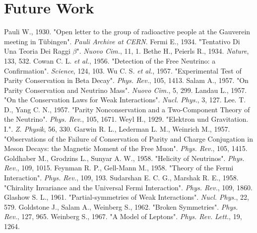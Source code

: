 \documentclass[english]{article}
\begin{document}
\section{Future Work}
    
\begin{thebibliography}{99}

    Pauli W., 1930. "Open letter to the group of radioactive people at the Gauverein meeting in T\"{u}bingen". \textit{Pauli Archive at CERN}.
    Fermi E., 1934. "Tentativo Di Una Teoria Dei Raggi $\beta$". \textit{Nuovo Cim.}, 11, 1.
    Bethe H., Peierls R., 1934. \textit{Nature}, 133, 532.
    Cowan C. L. \textit{et al.}, 1956. "Detection of the Free Neutrino: a Confirmation". \textit{Science}, 124, 103.
    Wu C. S. \textit{et al.}, 1957. "Experimental Test of Parity Conservation in Beta Decay". \textit{Phys. Rev.}, 105, 1413.
    Salam A., 1957. "On Parity Conservation and Neutrino Mass". \textit{Nuovo Cim.}, 5, 299.
    Landau L., 1957. "On the Conservation Laws for Weak Interactions". \textit{Nucl. Phys.}, 3, 127.
    Lee. T. D., Yang C. N., 1957. "Parity Nonconservation and a Two-Component Theory of the Neutrino". \textit{Phys. Rev.}, 105, 1671.
    Weyl H., 1929. "Elektron und Gravitation. I.". \textit{Z. Physik}, 56, 330.
    Garwin R. L., Lederman L. M., Weinrich M., 1957. "Observations of the Failure of Conservation of Parity and Charge Conjugation in Meson Decays: the Magnetic Moment of the Free Muon". \textit{Phys. Rev.}, 105, 1415.
    Goldhaber M., Grodzins L., Sunyar A. W., 1958. "Helicity of Neutrinos". \textit{Phys. Rev.}, 109, 1015.
    Feynman R. P., Gell-Mann M., 1958. "Theory of the Fermi Interaction". \textit{Phys. Rev.}, 109, 193.
    Sudarshan E. C. G., Marshak R. E., 1958. "Chirality Invariance and the Universal Fermi Interaction". \textit{Phys. Rev.}, 109, 1860.
    Glashow S. L., 1961. "Partial-symmetries of Weak Interactions". \textit{Nucl. Phys.}, 22, 579.
    Goldstone J., Salam A., Weinberg S., 1962. "Broken Symmetries". \textit{Phys. Rev.}, 127, 965.
    Weinberg S., 1967. "A Model of Leptons". \textit{Phys. Rev. Lett.}, 19, 1264.

\end{thebibliography}
\end{document}
